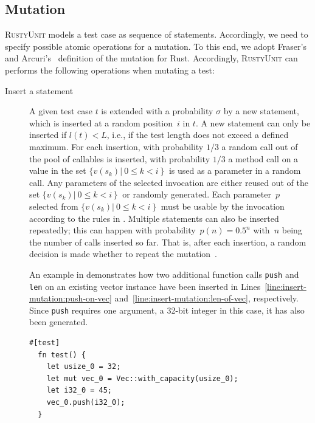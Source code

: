 \documentclass[paper=a4,%
  twoside,%
  BCOR4mm,%
  abstract=true,%
  toc=bibliography,%
  chapterprefix=true,%
  toc=bibliographynumbered,%
  open=right,%
  english,%
  pagesize=pdftex]{scrreprt}
\newcommand{\tech}{\textsc{RustyUnit}\xspace}
\begin{document}
\subsection{Mutation}
\tech models a test case as sequence of statements. Accordingly, we need to specify possible atomic operations for a mutation. To this end, we adopt Fraser's and Arcuri's~\cite{Fraser2012} definition of the mutation for Rust. Accordingly, \tech can performs the following operations when mutating a test:
\begin{description}
  \item[Insert a statement] A given test case $t$ is extended with a probability $\sigma$ by a new statement, which is inserted at a random position~$i$ in $t$. A new statement can only be inserted if $l(t) < L$, i.e., if the test length does not exceed a defined maximum. For each insertion, with probability $1/3$ a random call out of the pool of callables is inserted, with probability $1/3$ a method call on a value in the set $\{v(s_k) \left|~0 \leq k < i \right\}$ is used as a parameter in a random call. Any parameters of the selected invocation are either reused out of the set $\{v(s_k) \left|~0 \leq k < i \right\}$ or randomly generated. Each parameter~$p$ selected from $\{v(s_k) \left|~0 \leq k < i \right\}$ must be usable by the invocation according to the rules in . Multiple statements can also be inserted repeatedly; this can happen with probability~$p(n) = 0.5^n$ with~$n$ being the number of calls inserted so far. That is, after each insertion, a random decision is made whether to repeat the mutation~\cite{Tonella2004}. 
  
  An example in  demonstrates how two additional function calls \texttt{push} and \texttt{len} on an existing vector instance have been inserted in Lines~\ref{line:insert-mutation:push-on-vec} and~\ref{line:insert-mutation:len-of-vec}, respectively. Since \texttt{push} requires one argument, a 32-bit integer in this case, it has also been generated. 

  \begin{lstlisting}[style=boxed, label=lst:mutation-invocation-insertion, caption={The functions \texttt{push} and \texttt{len} have been selected randomly to be invoked on \emph{vec\string_0}. An appropriate argument has been generated for the second \emph{push}, too}, escapechar=§]
  #[test]
  fn test() {
    let usize_0 = 32;
    let mut vec_0 = Vec::with_capacity(usize_0);
    let i32_0 = 45;
    vec_0.push(i32_0);
  }


\end{lstlisting}
\end{description}
\end{document}
